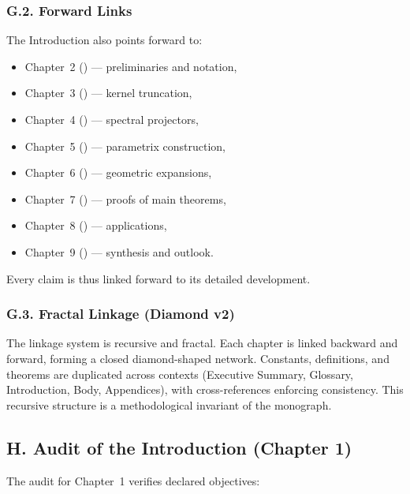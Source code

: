 \subsubsection*{G.2. Forward Links}
The Introduction also points forward to:
\begin{itemize}
  \item Chapter~2 () — preliminaries and notation,
  \item Chapter~3 () — kernel truncation,
  \item Chapter~4 () — spectral projectors,
  \item Chapter~5 () — parametrix construction,
  \item Chapter~6 () — geometric expansions,
  \item Chapter~7 () — proofs of main theorems,
  \item Chapter~8 () — applications,
  \item Chapter~9 () — synthesis and outlook.
\end{itemize}
Every claim is thus linked forward to its detailed development.

\subsubsection*{G.3. Fractal Linkage (Diamond v2)}
The linkage system is recursive and fractal.
Each chapter is linked backward and forward, forming a closed diamond-shaped network.
Constants, definitions, and theorems are duplicated across contexts
(Executive Summary, Glossary, Introduction, Body, Appendices),
with cross-references enforcing consistency.
This recursive structure is a methodological invariant of the monograph.

\subsection*{H. Audit of the Introduction (Chapter 1)}

The audit for Chapter~1 verifies declared objectives:

